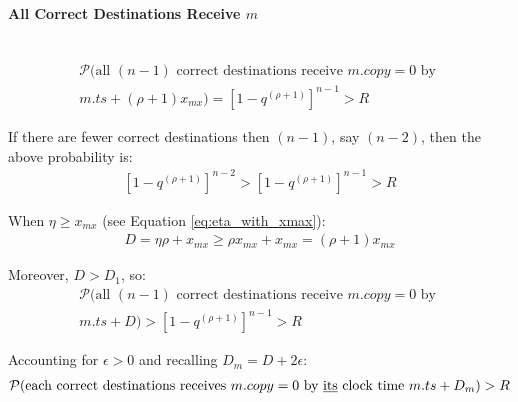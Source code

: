         \paragraph{All Correct Destinations Receive $m$}\hfill \\
        \begin{equation}
            \begin{aligned}
                \mathcal{P}(\text{all } (n-1) \text{ correct destinations receive } m.copy = 0 \text{ by } \\ 
                m.ts + (\rho + 1) x_{mx})  = \left[ 1 - q^{(\rho+1)} \right] ^ {n - 1} > R
            \end{aligned}
        \end{equation}
        
        If there are fewer correct destinations then $(n -1)$, say $(n - 2)$, then the above probability is:
        \begin{equation}
            \begin{split}
                \left[ 1 - q^{(\rho+1)} \right] ^ {n - 2} > \left[ 1 - q^{(\rho+1)} \right] ^ {n - 1} > R 
            \end{split}
        \end{equation}
        
        When $\eta \geq x_{mx}$ (see Equation \ref{eq:eta_with_xmax}):
        \begin{equation}
            \begin{aligned}
                D = \eta\rho + x_{mx} \geq \rho x_{mx} + x_{mx} = (\rho + 1) x_{mx}
            \end{aligned}
        \end{equation}
        
        Moreover, $D > D_1$, so:
        \begin{equation}
        \begin{aligned}
                \mathcal{P}(\text{all } (n-1) \text{ correct destinations receive } m.copy = 0 \text{ by } \\
                 m.ts + D)  > \left[ 1 - q^{(\rho+1)} \right] ^ {n - 1} > R
            \end{aligned}
        \end{equation}
                
        Accounting for $\epsilon > 0$ and recalling $D_m = D + 2\epsilon$:
        \begin{equation}
        \begin{aligned}
                \mathcal{P}(\text{each correct destinations receives } m.copy = 0 \text{ by \underline{its} clock time } m.ts + D_m) > R
            \end{aligned}
        \end{equation}
        
